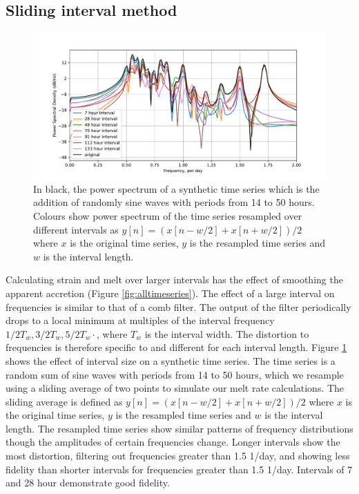 \subsection{Sliding interval method}

\label{sec:synthetic}
\begin{figure}[!ht]
\centering
\includegraphics[width=1\textwidth]{chapters/3/synthetic.pdf}
\caption[Method analysis]{In black, the power spectrum of a synthetic time series which is the addition of randomly sine waves with periods from 14 to 50 hours. Colours show power spectrum of the time series resampled over different intervals as $y[n] = (x[n-w/2]+x[n+w/2])/2$ where $x$ is the original time series, $y$ is the resampled time series and $w$ is the interval length.}
\label{fig:synthetic}
\end{figure}

Calculating strain and melt over larger intervals has the effect of smoothing the apparent accretion (Figure \ref{fig:alltimeseries}). The effect of a large interval on frequencies is similar to that of a comb filter. The output of the filter periodically drops to a local minimum at multiples of the interval frequency $1 / 2T_w, 3 / 2T_w, 5 / 2T_w \cdot$, where $T_w$ is the interval width. The distortion to frequencies is therefore specific to and different for each interval length. Figure \ref{fig:synthetic} shows the effect of interval size on a synthetic time series. The time series is a random sum of sine waves with periods from 14 to 50 hours, which we resample using a sliding average of two points to simulate our melt rate calculations. The sliding average is defined as $y[n] = (x[n-w/2]+x[n+w/2])/2$ where $x$ is the original time series, $y$ is the resampled time series and $w$ is the interval length. The resampled time series show similar patterns of frequency distributions though the amplitudes of certain frequencies change. Longer intervals show the most distortion, filtering out frequencies greater than 1.5 1/day, and showing less fidelity than shorter intervals for frequencies greater than 1.5 1/day. Intervals of 7 and 28 hour demonstrate good fidelity.

